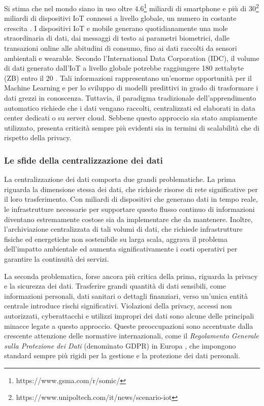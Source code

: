 \documentclass[a4paper, oneside, openright]{report}
\begin{document}
Si stima che nel mondo siano in uso oltre $4.6$\footnote{https://www.gsma.com/r/somic/} miliardi di smartphone e più di 30\footnote{https://www.unipoltech.com/it/news/scenario-iot} miliardi di dispositivi IoT connessi a livello globale, un numero in costante crescita \cite{Albreem2021Green}. I dispositivi IoT e mobile generano quotidianamente una mole straordinaria di dati, dai messaggi di testo ai parametri biometrici, dalle transazioni online alle abitudini di consumo, fino ai dati raccolti da sensori ambientali e wearable. Secondo l'International Data Corporation (IDC), il volume di dati generato dall'IoT a livello globale potrebbe raggiungere 180 zettabyte (ZB) entro il 20 \cite{Shi2019Edge}. Tali informazioni rappresentano un'enorme opportunità per il Machine Learning e per lo sviluppo di modelli predittivi in grado di trasformare i dati grezzi in conoscenza. Tuttavia, il paradigma tradizionale dell’apprendimento automatico richiede che i dati vengano raccolti, centralizzati ed elaborati in data center dedicati o su server cloud. Sebbene questo approccio sia stato ampiamente utilizzato, presenta criticità sempre più evidenti sia in termini di scalabilità che di rispetto della privacy.

\subsubsection*{Le sfide della centralizzazione dei dati}
La centralizzazione dei dati comporta due grandi problematiche. La prima riguarda la dimensione stessa dei dati, che richiede risorse di rete significative per il loro trasferimento. Con miliardi di dispositivi che generano dati in tempo reale, le infrastrutture necessarie per supportare questo flusso continuo di informazioni diventano estremamente costose sia da implementare che da mantenere. Inoltre, l'archiviazione centralizzata di tali volumi di dati, che richiede infrastrutture fisiche ed energetiche non sostenibile su larga scala, aggrava il problema dell'impatto ambientale ed aumenta significativamente i costi operativi per garantire la continuità dei servizi.

La seconda problematica, forse ancora più critica della prima, riguarda la privacy e la sicurezza dei dati. Trasferire grandi quantità di dati sensibili, come informazioni personali, dati sanitari o dettagli finanziari, verso un'unica entità centrale introduce rischi significativi. Violazioni della privacy, accessi non autorizzati, cyberattacchi e utilizzi impropri dei dati sono alcune delle principali minacce legate a questo approccio. Queste preoccupazioni sono accentuate dalla crescente attenzione delle normative internazionali, come il \textit{Regolamento Generale sulla Protezione dei Dati} (denominato GDPR) in Europa \cite{gdpr}, che impongono standard sempre più rigidi per la gestione e la protezione dei dati personali.
\end{document}
